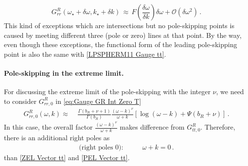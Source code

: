 \documentclass[11pt,a4paper]{article}
\begin{document}
\begin{equation}
    G^R_{rr}(\omega_\star + \delta \omega, k_\star + \delta k) \, \approx \, F\left(\frac{\delta \omega}{\delta k}\right) \delta \omega + \mathcal{O}(\delta \omega^2)\,.
\end{equation}
This kind of exceptions which are intersections but no pole-skipping points is caused by meeting different three (pole or zero) lines at that point.
By the way, even though these exceptions, the functional form of the leading pole-skipping point is also the same with \eqref{LPSPHERM11 Gauge tt}.\\

\paragraph{Pole-skipping in the extreme limit.}
For discussing the extreme limit of the pole-skipping with the integer $\nu$, we need to consider $G^R_{rr,0}$ in \eqref{eq:Gauge GR Int Zero T}
\begin{equation}\label{G0FORDD Vector rr}
\begin{split}
    G^R_{rr,0} (\omega, k)  \approx \,\, & \frac{\Gamma({b}_R+\nu+1)}{\Gamma({b}_R)} \frac{ \left( \omega-k \right)^{\nu} }{ \omega + k } \left[ \log (\omega-k) +\Psi\left({b}_R+\nu\right) \right]\,.
\end{split}
\end{equation}
In this case, the overall factor $\frac{(\omega-k)^\nu}{\omega+k}$ makes difference from $G^R_{tt,0}$. Therefore, there is an additional right poles as
\begin{align}\label{PEL Vector rr}
    \text{(right poles 0):} \qquad & \omega + k = 0\,.
\end{align}
than \eqref{ZEL Vector tt} and \eqref{PEL Vector tt}.\\
\end{document}
